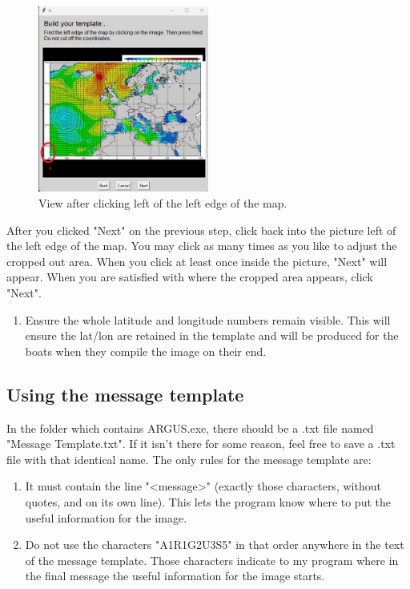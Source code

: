 \begin{figure}[H]
    \centering\includegraphics[width=0.5\textwidth]{TeX/Build_Template6.jpg}
    \caption{View after clicking left of the left edge of the map.}
\end{figure}
After you clicked "Next" on the previous step, click back into the picture left of the left edge of the map. You may click as many times as you like to adjust the cropped out area. When you click at least once inside the picture, "Next" will appear. When you  are satisfied with where the cropped area appears, click "Next".
\begin{enumerate}
    \item Ensure the whole latitude and longitude numbers remain visible.  This will ensure the lat/lon are retained in the template and will be produced for the boats when they compile the image on their end.
\end{enumerate}



\subsection{Using the message template}
In the folder which contains ARGUS.exe, there should be a .txt file named "Message Template.txt".  If it isn't there for some reason, feel free to save a .txt file with that identical name. The only rules for the message template are:
\begin{enumerate}
    \item It must contain the line "<message>" (exactly those characters, without quotes, and on its own line).  This lets the program know where to put the useful information for the image.
    \item Do not use the characters "A1R1G2U3S5" in that order anywhere in the text of the message template.  Those characters indicate to my program where in the final message the useful information for the image starts.
\end{enumerate}


